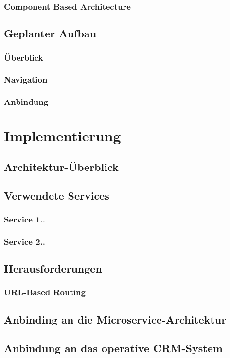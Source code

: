 \subsection{Component Based Architecture}
\section{Geplanter Aufbau}
\subsection{Überblick}
\subsection{Navigation}
\subsection{Anbindung}

\chapter{Implementierung}
\section{Architektur-Überblick}
\section{Verwendete Services}
\subsection{Service 1..}
\subsection{Service 2..}
\section{Herausforderungen}
\subsection{URL-Based Routing}
\section{Anbinding an die Microservice-Architektur}
\section{Anbindung an das operative CRM-System}

